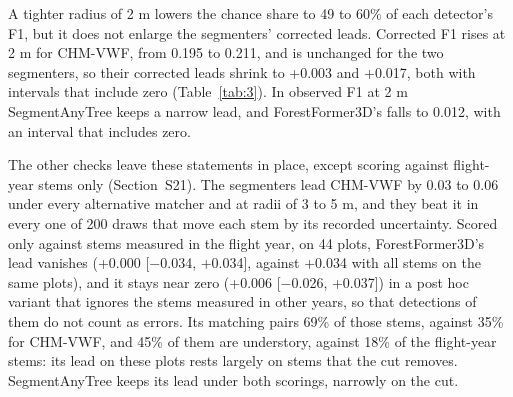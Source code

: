 \documentclass[preprint,12pt,authoryear,a4paper]{elsarticle}
\begin{document}
A tighter radius of 2 m lowers the chance share to 49 to 60\% of each detector's
F1, but it does not enlarge the segmenters' corrected leads. Corrected F1 rises
at 2 m for CHM-VWF, from 0.195 to 0.211, and is unchanged for the two
segmenters, so their corrected leads shrink to +0.003 and +0.017, both with
intervals that include zero (Table~\ref{tab:3}). In observed F1 at 2 m SegmentAnyTree
keeps a narrow lead, and ForestFormer3D's falls to 0.012, with an interval
that includes zero.

The other checks leave these statements in place, except scoring against
flight-year stems only (Section~S21). The segmenters lead CHM-VWF by 0.03 to
0.06 under every alternative matcher and at radii of 3 to 5 m, and they beat it
in every one of 200 draws that move each stem by its recorded uncertainty.
Scored only against stems measured in the flight year, on 44 plots,
ForestFormer3D's lead vanishes (+0.000 [$-$0.034, +0.034], against +0.034 with all
stems on the same plots), and it stays near zero (+0.006 [$-$0.026, +0.037]) in a
post hoc variant that ignores the stems measured in other years, so that
detections of them do not count as errors. Its matching pairs 69\% of those
stems, against 35\% for CHM-VWF, and 45\% of them are understory, against 18\% of
the flight-year stems: its lead on these plots rests largely on stems that the
cut removes. SegmentAnyTree keeps its lead under both scorings, narrowly on the
cut.
\end{document}

